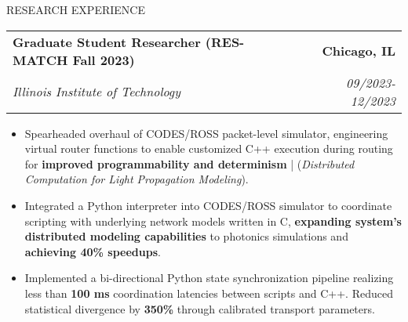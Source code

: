 \documentclass{resume} %
\begin{document}
\vspace{-5pt} %
\begin{rSection}{RESEARCH EXPERIENCE}

   \begin{tabularx}{\textwidth}{@{}X r}
      \textbf{Graduate Student Researcher (RES-MATCH Fall 2023)} & \textbf{Chicago, IL} \\
      \textit{Illinois Institute of Technology} & \textit{09/2023-12/2023} \\
   \end{tabularx}


   \begin{minipage}[t]{1\textwidth}
      \begin{itemize}[left=0pt, nosep, before=\vspace{-0.5\baselineskip}]

\item \small Spearheaded overhaul of CODES/ROSS packet-level simulator, engineering virtual router functions to enable customized C++ execution during routing for \textbf{improved programmability and determinism} | (\textit{Distributed Computation for Light Propagation Modeling}). 


\item \small Integrated a Python interpreter into CODES/ROSS simulator to coordinate scripting with underlying network models written in C, \textbf{expanding system's distributed modeling capabilities} to photonics simulations and \textbf{achieving 40\% speedups}.

\item \small Implemented a bi-directional Python state synchronization pipeline realizing less than \textbf{100 ms} coordination latencies between scripts and C++. Reduced statistical divergence by \textbf{350\%} through calibrated transport parameters.


      \end{itemize}
   \end{minipage}


\end{rSection}
\end{document}
